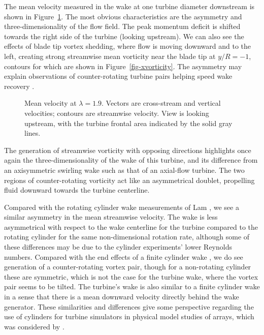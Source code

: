 The mean velocity measured in the wake at one turbine diameter downstream is
shown in Figure~\ref{fig-meanvel}. The most obvious characteristics are the
asymmetry and three-dimensionality of the flow field. The peak momentum deficit
is shifted towards the right side of the turbine (looking upstream). We can also
see the effects of blade tip vortex shedding, where flow is moving downward and
to the left, creating strong streamwise mean vorticity near the blade tip at
$y/R=-1$, contours for which are shown in  Figure~\ref{fig-xvorticity}. The
asymmetry may explain observations of counter-rotating turbine pairs helping
speed wake recovery \cite{Dabiri2011}.

\begin{figure}
    \centering
    \caption{Mean velocity at $\lambda=1.9$. Vectors are cross-stream and
        vertical velocities; contours are streamwise velocity. View is looking 
        upstream, with the turbine frontal area indicated by the solid gray lines.}
    \label{fig-meanvel}
\end{figure}

The generation of streamwise vorticity with opposing directions highlights once
again the three-dimensionality of the wake of this turbine, and its difference
from an axisymmetric swirling wake such as that of an axial-flow turbine. The
two regions of counter-rotating vorticity act like an asymmetrical doublet,
propelling fluid downward towards the turbine centerline.

Compared with the rotating cylinder wake measurements of Lam \cite{Lam2009}, we
see a similar asymmetry in the mean streamwise velocity. The wake is less
asymmetrical with respect to the wake centerline for the turbine compared to the
rotating cylinder for the same non-dimensional rotation rate, although some of
these differences may be due to the cylinder experiments' lower Reynolds
numbers. Compared with the end effects of a finite cylinder wake
\cite{Sumner2004}, we do see generation of a counter-rotating vortex pair,
though for a non-rotating cylinder these are symmetric, which is not the case
for the turbine wake, where the vortex pair seems to be tilted. The turbine's
wake is also similar to a finite cylinder wake in a sense that there is a mean
downward velocity directly behind the wake generator. These similarities and
differences give some perspective regarding the use of cylinders for turbine
simulators in physical model studies of arrays, which was considered by
\cite{Pierce2013}.

